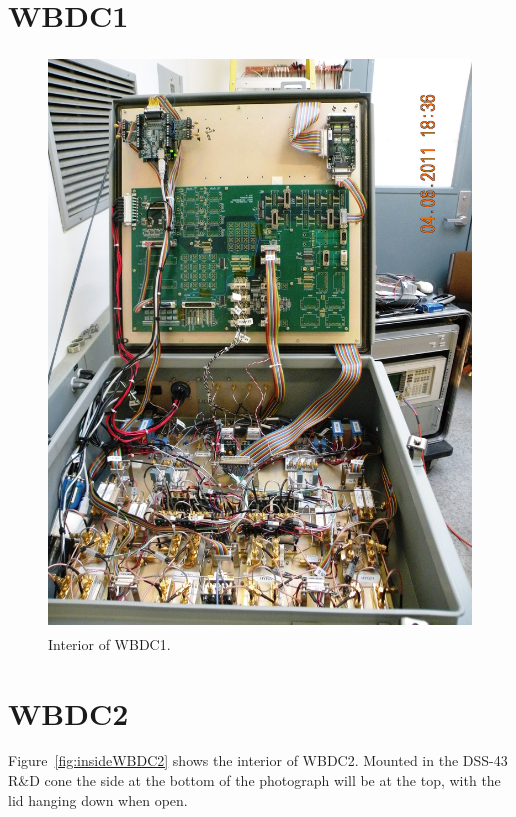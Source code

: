 \documentclass[letterpaper,11pt]{book}
\begin{document}
\section{WBDC1}

\begin{figure}[h!tb]
  \begin{center}
    \includegraphics[height=6in]{WBDC1inside.jpg}
  \end{center}
  \caption{\label{fig:insideWBDC1}Interior of WBDC1.}
\end{figure}

\section{WBDC2}\label{sec:WBDC2}

Figure~\ref{fig:insideWBDC2} shows the interior of WBDC2. Mounted in the
DSS-43 R\&D cone the side at the bottom of the photograph will be at the top,
with the lid hanging down when open.
\end{document}
